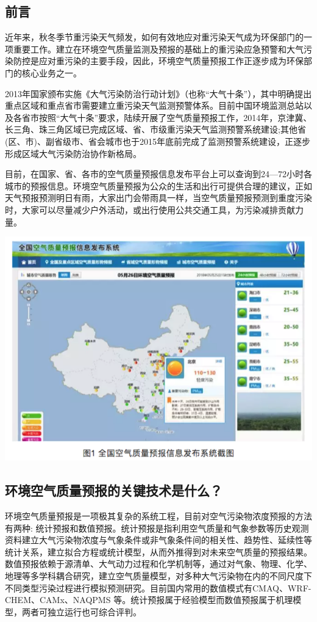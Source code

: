 \documentclass[]{book}
\begin{document}
\subsection{前言}\label{-3}

近年来，秋冬季节重污染天气频发，如何有效地应对重污染天气成为环保部门的一项重要工作。建立在环境空气质量监测及预报的基础上的重污染应急预警和大气污染防控是应对重污染的主要手段，因此，环境空气质量预报工作正逐步成为环保部门的核心业务之一。

2013年国家颁布实施《大气污染防治行动计划》（也称``大气十条''），其中明确提出重点区域和重点省市需要建立重污染天气监测预警体系。目前中国环境监测总站以及各省市按照``大气十条''要求，陆续开展了空气质量预报工作，2014年，京津冀、长三角、珠三角区域已完成区域、省、市级重污染天气监测预警系统建设;其他省(区、市)、副省级市、省会城市也于2015年底前完成了监测预警系统建设，正逐步形成区域大气污染防治协作新格局。

目前，在国家、省、各市的空气质量预报信息发布平台上可以查询到24---72小时各城市的预报信息。环境空气质量预报为公众的生活和出行可提供合理的建议，正如天气预报预测明日有雨，大家出门会带雨具一样，当空气质量预报预测到重度污染时，大家可以尽量减少户外活动，或出行使用公共交通工具，为污染减排贡献力量。

\includegraphics[width=8.33in]{images/kqyb1}

\subsection{环境空气质量预报的关键技术是什么？}

环境空气质量预报是一项极其复杂的系统工程，目前对空气污染物浓度预报的方法有两种:
统计预报和数值预报。统计预报是指利用空气质量和气象参数等历史观测资料建立大气污染物浓度与气象条件或非气象条件间的相关性、趋势性、延续性等统计关系，建立拟合方程或统计模型，从而外推得到对未来空气质量的预报结果。数值预报依赖于源清单、大气动力过程和化学机制等，通过对气象、物理、化学、地理等多学科耦合研究，建立空气质量模型，对多种大气污染物在内的不同尺度下不同类型污染过程进行模拟预测研究。目前国内常用的数值模式有CMAQ、WRF-CHEM、CAMx、NAQPMS
等。统计预报属于经验模型而数值预报属于机理模型，两者可独立运行也可综合评判。
\end{document}
